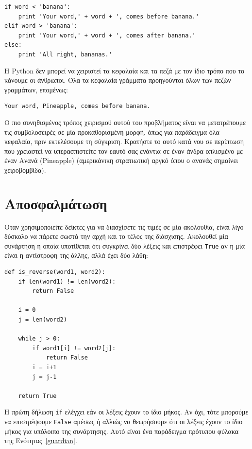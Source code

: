 \documentclass[10pt]{book}
\begin{document}
\begin{verbatim}
if word < 'banana':
    print 'Your word,' + word + ', comes before banana.'
elif word > 'banana':
    print 'Your word,' + word + ', comes after banana.'
else:
    print 'All right, bananas.'
\end{verbatim}
%

Η Python δεν μπορεί να χειριστεί τα κεφαλαία και τα πεζά με τον ίδιο τρόπο
που το κάνουμε οι άνθρωποι. Όλα τα κεφαλαία γράμματα προηγούνται όλων των πεζών γραμμάτων, επομένως:

\begin{verbatim}
Your word, Pineapple, comes before banana.
\end{verbatim}
%

Ο πιο συνηθισμένος τρόπος χειρισμού αυτού του προβλήματος είναι να μετατρέπουμε τις συμβολοσειρές σε μία προκαθορισμένη μορφή, όπως για παράδειγμα όλα κεφαλαία, πριν εκτελέσουμε τη σύγκριση. Κρατήστε το αυτό κατά νου σε περίπτωση που χρειαστεί να υπερασπιστείτε τον εαυτό σας ενάντια σε έναν άνδρα οπλισμένο με έναν Ανανά (Pineapple) (αμερικάνικη στρατιωτική αργκό όπου ο ανανάς σημαίνει χειροβομβίδα).


\section{Αποσφαλμάτωση}

Όταν χρησιμοποιείτε δείκτες για να διασχίσετε τις τιμές σε μία ακολουθία,
είναι λίγο δύσκολο να πάρετε σωστά την αρχή και το τέλος της διάσχισης. Ακολουθεί μία συνάρτηση η οποία υποτίθεται ότι συγκρίνει δύο λέξεις και επιστρέφει {\tt True} αν η μία είναι η αντίστροφη της άλλης, αλλά έχει δύο λάθη:

\begin{verbatim}
def is_reverse(word1, word2):
    if len(word1) != len(word2):
        return False

    i = 0
    j = len(word2)

    while j > 0:
        if word1[i] != word2[j]:
            return False
        i = i+1
        j = j-1

    return True
\end{verbatim}
%

Η πρώτη δήλωση {\tt if} ελέγχει εάν οι λέξεις έχουν το ίδιο μήκος.
Αν όχι, τότε μπορούμε να επιστρέψουμε {\tt False} αμέσως ή αλλιώς να θεωρήσουμε 
ότι οι λέξεις έχουν το ίδιο μήκος για υπόλοιπο της συνάρτησης.
Αυτό είναι ένα παράδειγμα πρότυπου φύλακα της Ενότητας~\ref{guardian}.
\end{document}

